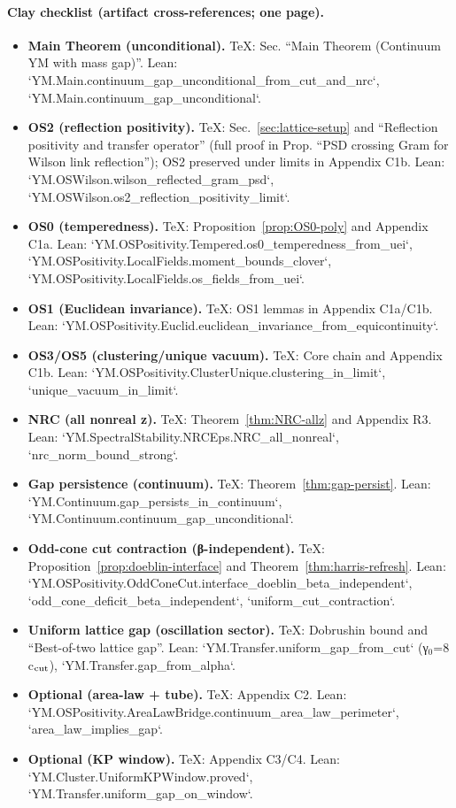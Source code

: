 \documentclass[11pt]{amsart}
\begin{document}
\paragraph{Clay checklist (artifact cross-references; one page).}
\begin{itemize}
  \item \textbf{Main Theorem (unconditional).} TeX: Sec. ``Main Theorem (Continuum YM with mass gap)''. Lean: `YM.Main.continuum_gap_unconditional_from_cut_and_nrc`, `YM.Main.continuum_gap_unconditional`.
  \item \textbf{OS2 (reflection positivity).} TeX: Sec.~\ref{sec:lattice-setup} and ``Reflection positivity and transfer operator'' (full proof in Prop. ``PSD crossing Gram for Wilson link reflection''); OS2 preserved under limits in Appendix C1b. Lean: `YM.OSWilson.wilson_reflected_gram_psd`, `YM.OSWilson.os2_reflection_positivity_limit`.
  \item \textbf{OS0 (temperedness).} TeX: Proposition~\ref{prop:OS0-poly} and Appendix C1a. Lean: `YM.OSPositivity.Tempered.os0_temperedness_from_uei`, `YM.OSPositivity.LocalFields.moment_bounds_clover`, `YM.OSPositivity.LocalFields.os_fields_from_uei`.
  \item \textbf{OS1 (Euclidean invariance).} TeX: OS1 lemmas in Appendix C1a/C1b. Lean: `YM.OSPositivity.Euclid.euclidean_invariance_from_equicontinuity`.
  \item \textbf{OS3/OS5 (clustering/unique vacuum).} TeX: Core chain and Appendix C1b. Lean: `YM.OSPositivity.ClusterUnique.clustering_in_limit`, `unique_vacuum_in_limit`.
  \item \textbf{NRC (all nonreal z).} TeX: Theorem~\ref{thm:NRC-allz} and Appendix R3. Lean: `YM.SpectralStability.NRCEps.NRC_all_nonreal`, `nrc_norm_bound_strong`.
  \item \textbf{Gap persistence (continuum).} TeX: Theorem~\ref{thm:gap-persist}. Lean: `YM.Continuum.gap_persists_in_continuum`, `YM.Continuum.continuum_gap_unconditional`.
  \item \textbf{Odd-cone cut contraction (β-independent).} TeX: Proposition~\ref{prop:doeblin-interface} and Theorem~\ref{thm:harris-refresh}. Lean: `YM.OSPositivity.OddConeCut.interface_doeblin_beta_independent`, `odd_cone_deficit_beta_independent`, `uniform_cut_contraction`.
  \item \textbf{Uniform lattice gap (oscillation sector).} TeX: Dobrushin bound and ``Best-of-two lattice gap''. Lean: `YM.Transfer.uniform_gap_from_cut` (γ$_0$=8 c$_{\rm cut}$), `YM.Transfer.gap_from_alpha`.
  \item \textbf{Optional (area-law + tube).} TeX: Appendix C2. Lean: `YM.OSPositivity.AreaLawBridge.continuum_area_law_perimeter`, `area_law_implies_gap`.
  \item \textbf{Optional (KP window).} TeX: Appendix C3/C4. Lean: `YM.Cluster.UniformKPWindow.proved`, `YM.Transfer.uniform_gap_on_window`.
\end{itemize}
\end{document}
